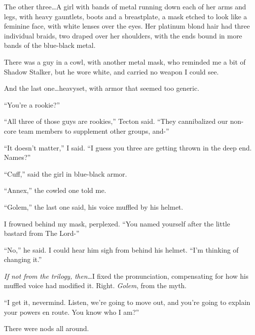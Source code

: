 The other three\ldots A girl with bands of metal running down each of her arms and legs, with heavy gauntlets, boots and a breastplate, a mask etched to look like a feminine face, with white lenses over the eyes.  Her platinum blond hair had three individual braids, two draped over her shoulders, with the ends bound in more bands of the blue-black metal.



There was a guy in a cowl, with another metal mask, who reminded me a bit of Shadow Stalker, but he wore white, and carried no weapon I could see.



And the last one\ldots heavyset, with armor that seemed too generic.



``You're a rookie?''



``All three of those guys are rookies,'' Tecton said.  ``They cannibalized our non-core team members to supplement other groups, and-''



``It doesn't matter,'' I said.  ``I guess you three are getting thrown in the deep end.  Names?''



``Cuff,'' said the girl in blue-black armor.



``Annex,'' the cowled one told me.



``Golem,'' the last one said, his voice muffled by his helmet.



I frowned behind my mask, perplexed.  ``You named yourself after the little bastard from The Lord-''



``No,'' he said.  I could hear him sigh from behind his helmet.  ``I'm thinking of changing it.''



\emph{If not from the trilogy, then\ldots  }I fixed the pronunciation, compensating for how his muffled voice had modified it.  Right.  \emph{Golem}, from the myth.



``I get it, nevermind.  Listen, we're going to move out, and you're going to explain your powers en route.  You know who I am?''



There were nods all around.



